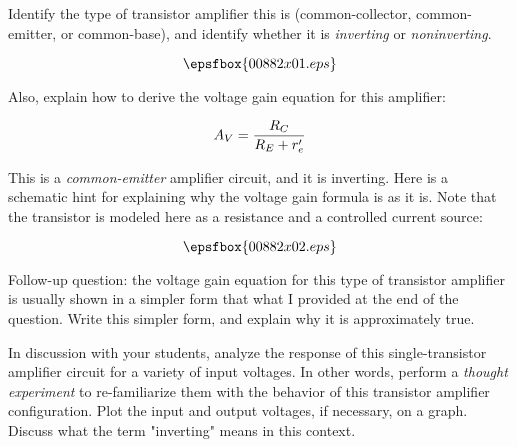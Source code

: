 

Identify the type of transistor amplifier this is (common-collector, common-emitter, or common-base), and identify whether it is {\it inverting} or {\it noninverting}.

$$\epsfbox{00882x01.eps}$$

Also, explain how to derive the voltage gain equation for this amplifier:

$$A_V = {R_C \over {R_E + r'_e}}$$







This is a {\it common-emitter} amplifier circuit, and it is inverting.  Here is a schematic hint for explaining why the voltage gain formula is as it is.  Note that the transistor is modeled here as a resistance and a controlled current source:

$$\epsfbox{00882x02.eps}$$

\vskip 10pt

Follow-up question: the voltage gain equation for this type of transistor amplifier is usually shown in a simpler form that what I provided at the end of the question.  Write this simpler form, and explain why it is approximately true.







In discussion with your students, analyze the response of this single-transistor amplifier circuit for a variety of input voltages.  In other words, perform a {\it thought experiment} to re-familiarize them with the behavior of this transistor amplifier configuration.  Plot the input and output voltages, if necessary, on a graph.  Discuss what the term "inverting" means in this context.




